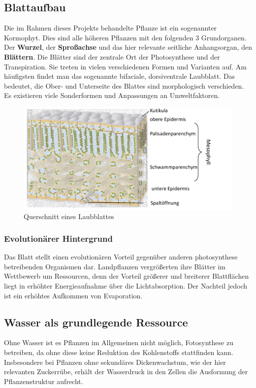 \subsection{Blattaufbau}
Die im Rahmen dieses Projekts behandelte Pflanze ist ein sogenannter Kormophyt. Dies sind alle höheren Pflanzen mit den folgenden 3 Grundorganen. Der \textbf{Wurzel}, der \textbf{Sproßachse} und das hier relevante seitliche Anhangsorgan, den \textbf{Blättern}. Die Blätter sind der zentrale Ort der Photosynthese und der Transpiration. Sie treten in vielen verschiedenen Formen und Varianten auf. Am häufigsten findet man das sogenannte bifaciale, dorsiventrale Laubblatt. Das bedeutet, die Ober- und Unterseite des Blattes sind morphologisch verschieden. Es existieren viele Sonderformen und Anpassungen an Umweltfaktoren.
\begin{figure}
    \centering
    \includegraphics[width=0.7\linewidth]{Bildschirmfoto vom 2025-03-30 19-59-09.png}
    \caption{Querschnitt eines Laubblattes}
    \label{fig:enter-label}
\end{figure}
\subsubsection{Evolutionärer Hintergrund}
Das Blatt stellt einen evolutionären Vorteil gegenüber anderen photosynthese betreibenden Organismen dar. Landpflanzen vergrößerten ihre Blätter im Wettbewerb um Ressourcen, denn der Vorteil größerer und breiterer Blattflächen liegt in erhöhter Energieaufnahme über die Lichtabsorption. Der Nachteil jedoch ist ein erhöhtes Aufkommen von Evaporation.
\subsection{Wasser als grundlegende Ressource}
Ohne Wasser ist es Pflanzen im Allgemeinen nicht möglich, Fotosynthese zu betreiben, da ohne diese keine Reduktion des Kohlenstoffs stattfinden kann. Insbesondere bei Pflanzen ohne sekundäres Dickenwachstum, wie der hier relevanten Zuckerrübe, erhält der Wasserdruck in den Zellen die Ausformung der Pflanzenstruktur aufrecht. \cite{oeko}
